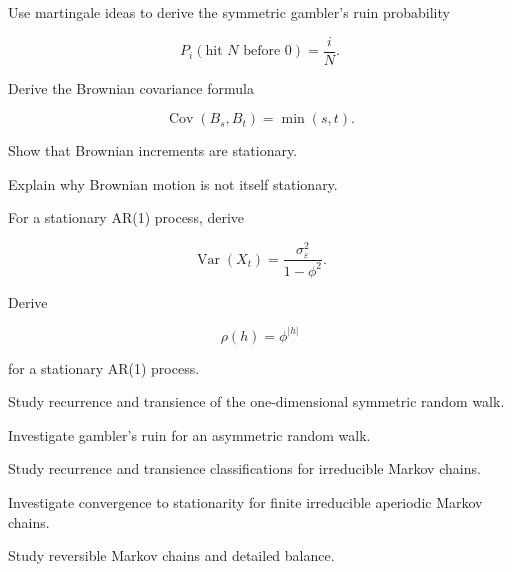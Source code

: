 \begin{exercise}[3]
Use martingale ideas to derive the symmetric gambler's ruin probability

\[
P_i(\text{hit }N\text{ before }0)
=
\frac{i}{N}.
\]
\end{exercise}

\begin{exercise}[3]
Derive the Brownian covariance formula

\[
\operatorname{Cov}(B_s,B_t)
=
\min(s,t).
\]
\end{exercise}

\begin{exercise}[3]
Show that Brownian increments are stationary.
\end{exercise}

\begin{exercise}[3]
Explain why Brownian motion is not itself stationary.
\end{exercise}

\begin{exercise}[3]
For a stationary AR(1) process, derive

\[
\operatorname{Var}(X_t)
=
\frac{
\sigma_\varepsilon^2
}{
1-\phi^2
}.
\]
\end{exercise}

\begin{exercise}[3]
Derive

\[
\rho(h)=\phi^{|h|}
\]

for a stationary AR(1) process.
\end{exercise}

\begin{exercise}[4]
Study recurrence and transience of the one-dimensional symmetric random
walk.
\end{exercise}

\begin{exercise}[4]
Investigate gambler's ruin for an asymmetric random walk.
\end{exercise}

\begin{exercise}[4]
Study recurrence and transience classifications for irreducible Markov
chains.
\end{exercise}

\begin{exercise}[4]
Investigate convergence to stationarity for finite irreducible
aperiodic Markov chains.
\end{exercise}

\begin{exercise}[4]
Study reversible Markov chains and detailed balance.
\end{exercise}

